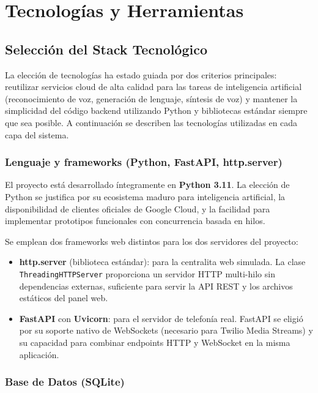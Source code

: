 \chapter{\textbf{Tecnologías y Herramientas}}
\label{ch:Tecnologias}
\thispagestyle{fancy}

\section{Selección del Stack Tecnológico}
\label{sec:stack_tecnologico}

La elección de tecnologías ha estado guiada por dos criterios principales: reutilizar servicios cloud de alta calidad para las tareas de inteligencia artificial (reconocimiento de voz, generación de lenguaje, síntesis de voz) y mantener la simplicidad del código backend utilizando Python y bibliotecas estándar siempre que sea posible. A continuación se describen las tecnologías utilizadas en cada capa del sistema.

\subsection{Lenguaje y frameworks (Python, FastAPI, http.server)}
\label{subsec:backend_stack}

El proyecto está desarrollado íntegramente en \textbf{Python 3.11}. La elección de Python se justifica por su ecosistema maduro para inteligencia artificial, la disponibilidad de clientes oficiales de Google Cloud, y la facilidad para implementar prototipos funcionales con concurrencia basada en hilos.

Se emplean dos frameworks web distintos para los dos servidores del proyecto:

\begin{itemize}
    \item \textbf{http.server} (biblioteca estándar): para la centralita web simulada. La clase \texttt{ThreadingHTTPServer} proporciona un servidor HTTP multi-hilo sin dependencias externas, suficiente para servir la API REST y los archivos estáticos del panel web.
    \item \textbf{FastAPI} con \textbf{Uvicorn}: para el servidor de telefonía real. FastAPI se eligió por su soporte nativo de WebSockets (necesario para Twilio Media Streams) y su capacidad para combinar endpoints HTTP y WebSocket en la misma aplicación.
\end{itemize}

\subsection{Base de Datos (SQLite)}
\label{subsec:base_datos_stack}

